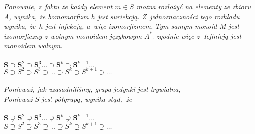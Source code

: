 \documentclass[a4paper,11pt]{article}
\begin{document}
\Powin \textit{Ponownie, z~faktu że każdy element $m \in S$ można rozłożyć na
  elementy ze zbioru $A$, wynika, że homomorfizm $h$ jest suriekcją.
  Z~jednoznaczności tego rozkładu wynika, że~$h$ jest infekcją, a~więc
  izomorfizmem. Tym samym monoid $M$ jest izomorficzny z~wolnym monoidem
  językowym $A^{ * }$, zgodnie więc z~definicją jest monoidem wolnym.} \\
 \\
\Jest  $\mathbf{S} \supset \mathbf{S}^{ 2 } \supset \mathbf{S}^{ 3 } \ldots
\supset \mathbf{S}^{ k } \supset \mathbf{S}^{ k + 1 } ...$ \\
\Powin $S \supset S^{ 2 } \supset S^{ 3 } \supset \ldots \supset S^{ k } \supset S^{ k + 1 } \supset \ldots$ \\
 \\
\Jest  \textit{Ponieważ, jak uzasadniliśmy, grupa jedynki jest trywialna,}
\\
\Powin \textit{Ponieważ $S$ jest półgrupą, wynika stąd,~że} \\
 \\
\Jest  $\mathbf{S} \supsetneq \mathbf{S}^{ 2 } \supsetneq \mathbf{S}^{ 3 } \ldots
\supsetneq \mathbf{S}^{ k } \supsetneq \mathbf{S}^{ k + 1 } \ldots$ \\
\Powin $S \supsetneq S^{ 2 } \supsetneq S^{ 3 } \supsetneq \ldots \supsetneq S^{ k } \supsetneq S^{ k + 1 } \supsetneq \ldots$ \\



\vspace{\spaceTwo}












{}






\end{document}
